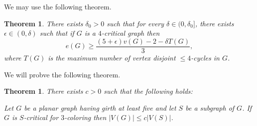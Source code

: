 \documentclass[letterpaper,12pt,oneside,onecolumn]{article}
\newtheorem{theorem}[fact]{Theorem}
\begin{document}
\section{}
\paragraph{}
We may use the following theorem.
\begin{theorem}\label{th:four}
	There exists $\delta_0 >0$ such that for every $\delta \in (0,\delta_0]$, there exists $\epsilon \in (0,\delta)$ such that if $G$ is a $4$-critical graph then
	$$e(G) \geq \frac{(5+\epsilon)v(G) - 2 - \delta T(G)}{3},$$
	where $T(G)$ is the maximum number of vertex disjoint $\leq 4$-cycles in $G$.
\end{theorem}
We will probve the following theorem.
\begin{theorem}
	There exists $c>0$ such that the following holds:
	
	Let $G$ be a planar graph having girth at least five and let $S$ be a subgraph of $G$. If $G$ is $S$-critical for $3$-coloring then $|V(G)| \leq c|V(S)|$.
\end{theorem}
\end{document}
